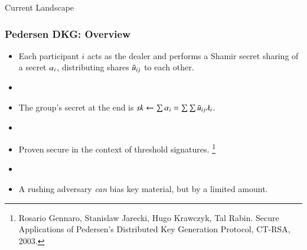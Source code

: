 \documentclass[hyperref={pdfpagelabels=true},table,dvipsnames,14pt,aspectratio=169]{beamer}
\begin{document}
\begin{frame}
  \huge
  \centering
  Current Landscape
\end{frame}

\begin{frame}
  \frametitle{Pedersen DKG: Overview}

  \begin{itemize}
    \item<1-> Each participant $i$ acts as the dealer and performs a Shamir secret sharing of a secret $\alpha_i$,
      distributing shares $\bar{u}_{ij}$ to each other.
    \item[]
    \item<2-> The group's secret at the end is $\mathit{sk} \gets \sum \alpha_i = \sum \sum \bar{u}_{ij} \lambda_i$.
    \item[]
    \item<3-> Proven secure in the context of threshold signatures.
  \footnote{
  Rosario Gennaro, Stanislaw Jarecki, Hugo Krawczyk, Tal Rabin.
  Secure Applications of Pedersen's Distributed Key Generation Protocol,
  CT-RSA, 2003.}
    \item[]
    \item<4-> A rushing adversary \emph{can} bias key material, but by a limited amount.
  \end{itemize}
\end{frame}




\begin{frame}
  \centering
{}
\end{frame}
\end{document}
